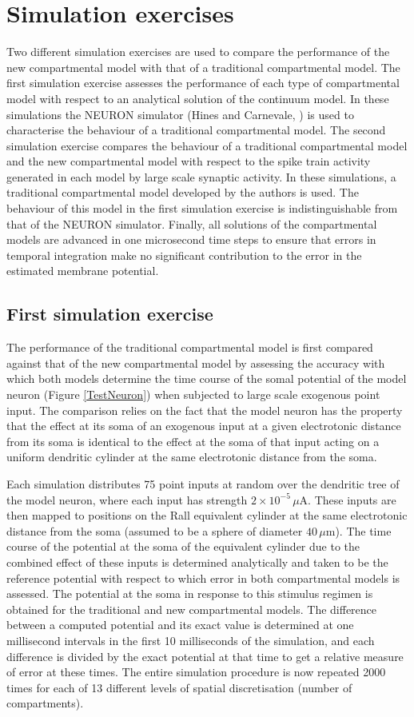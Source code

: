 \section{Simulation exercises}
Two different simulation exercises are used to compare the
performance of the new compartmental model with that of a
traditional compartmental model. The first simulation exercise
assesses the performance of each type of compartmental model with
respect to an analytical solution of the continuum model. In these
simulations the NEURON simulator (Hines and Carnevale,
\cite{Hines97}) is used to characterise the behaviour of a
traditional compartmental model. The second simulation exercise
compares the behaviour of a traditional compartmental model and
the new compartmental model with respect to the spike train
activity generated in each model by large scale synaptic activity.
In these simulations, a traditional compartmental model developed
by the authors is used. The behaviour of this model in the first
simulation exercise is indistinguishable from that of the NEURON
simulator. Finally, all solutions of the compartmental models are
advanced in one microsecond time steps to ensure that errors in
temporal integration make no significant contribution to the error
in the estimated membrane potential.

\subsection{First simulation exercise}\label{sim1}
The performance of the traditional compartmental model is first
compared against that of the new compartmental model by assessing
the accuracy with which both models determine the time course of
the somal potential of the model neuron (Figure \ref{TestNeuron})
when subjected to large scale exogenous point input. The
comparison relies on the fact that the model neuron has the
property that the effect at its soma of an exogenous input at a
given electrotonic distance from its soma is identical to the
effect at the soma of that input acting on a uniform dendritic
cylinder at the same electrotonic distance from the soma.

Each simulation distributes 75 point inputs at random over the
dendritic tree of the model neuron, where each input has strength
$2\times10^{-5}\,\mu$A. These inputs are then mapped to positions
on the Rall equivalent cylinder at the same electrotonic distance
from the soma (assumed to be a sphere of diameter $40\,\mu$m). The
time course of the potential at the soma of the equivalent
cylinder due to the combined effect of these inputs is determined
analytically and taken to be the reference potential with respect
to which error in both compartmental models is assessed. The
potential at the soma in response to this stimulus regimen is
obtained for the traditional and new compartmental models. The
difference between a computed potential and its exact value is
determined at one millisecond intervals in the first 10
milliseconds of the simulation, and each difference is divided by
the exact potential at that time to get a relative measure of
error at these times. The entire simulation procedure is now
repeated 2000 times for each of 13 different levels of spatial
discretisation (number of compartments).

